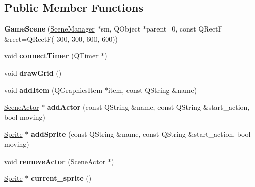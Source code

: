 \subsection*{Public Member Functions}
\begin{DoxyCompactItemize}
\item 
\mbox{\label{class_game_scene_abf292a17082d258a7c9a670c2eda50ea}} 
{\bfseries Game\+Scene} (\hyperlink{class_scene_manager}{Scene\+Manager} $\ast$sm, Q\+Object $\ast$parent=0, const Q\+RectF \&rect=Q\+RectF(-\/300,-\/300, 600, 600))
\item 
\mbox{\label{class_game_scene_a02a45a8bd424e6a09fb928b84abab216}} 
void {\bfseries connect\+Timer} (Q\+Timer $\ast$)
\item 
\mbox{\label{class_game_scene_ab0f133a857eac33d3d3f4a0d0293fb33}} 
void {\bfseries draw\+Grid} ()
\item 
\mbox{\label{class_game_scene_a5472c7fdab73c3f2633861a2fc77fdfc}} 
void {\bfseries add\+Item} (Q\+Graphics\+Item $\ast$item, const Q\+String \&name)
\item 
\mbox{\label{class_game_scene_a51c98b3db623b2247afa8b6360d4a04b}} 
\hyperlink{class_actor}{Scene\+Actor} $\ast$ {\bfseries add\+Actor} (const Q\+String \&name, const Q\+String \&start\+\_\+action, bool moving)
\item 
\mbox{\label{class_game_scene_adfa6afce903509fba5324dd822365937}} 
\hyperlink{class_sprite}{Sprite} $\ast$ {\bfseries add\+Sprite} (const Q\+String \&name, const Q\+String \&start\+\_\+action, bool moving)
\item 
\mbox{\label{class_game_scene_a9ce725296c40edfad55477389d771b5a}} 
void {\bfseries remove\+Actor} (\hyperlink{class_actor}{Scene\+Actor} $\ast$)
\item 
\mbox{\label{class_game_scene_a7c837f21ae8de156ffe364f61512126d}} 
\hyperlink{class_sprite}{Sprite} $\ast$ {\bfseries current\+\_\+sprite} ()
\item 
\mbox{\label{class_game_scene_a583bc8b9dbeb21d89be15c1e9af85898}} 

\end{DoxyCompactItemize}
